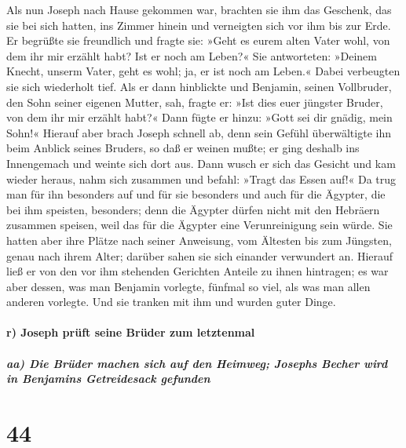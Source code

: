  Als nun Joseph nach Hause gekommen war, brachten sie ihm
das Geschenk, das sie bei sich hatten, ins Zimmer hinein und verneigten
sich vor ihm bis zur Erde.  Er begrüßte sie freundlich
und fragte sie: »Geht es eurem alten Vater wohl, von dem ihr mir erzählt
habt? Ist er noch am Leben?«  Sie antworteten: »Deinem
Knecht, unserm Vater, geht es wohl; ja, er ist noch am Leben.« Dabei
verbeugten sie sich wiederholt tief.  Als er dann
hinblickte und Benjamin, seinen Vollbruder, den Sohn seiner eigenen
Mutter, sah, fragte er: »Ist dies euer jüngster Bruder, von dem ihr mir
erzählt habt?« Dann fügte er hinzu: »Gott sei dir gnädig, mein Sohn!«
 Hierauf aber brach Joseph schnell ab, denn sein Gefühl
überwältigte ihn beim Anblick seines Bruders, so daß er weinen mußte; er
ging deshalb ins Innengemach und weinte sich dort aus. 
Dann wusch er sich das Gesicht und kam wieder heraus, nahm sich zusammen
und befahl: »Tragt das Essen auf!«  Da trug man für ihn
besonders auf und für sie besonders und auch für die Ägypter, die bei
ihm speisten, besonders; denn die Ägypter dürfen nicht mit den Hebräern
zusammen speisen, weil das für die Ägypter eine Verunreinigung sein
würde.  Sie hatten aber ihre Plätze nach seiner
Anweisung, vom Ältesten bis zum Jüngsten, genau nach ihrem Alter;
darüber sahen sie sich einander verwundert an.  Hierauf
ließ er von den vor ihm stehenden Gerichten Anteile zu ihnen hintragen;
es war aber dessen, was man Benjamin vorlegte, fünfmal so viel, als was
man allen anderen vorlegte. Und sie tranken mit ihm und wurden guter
Dinge.

\hypertarget{r-joseph-pruxfcft-seine-bruxfcder-zum-letztenmal}{%
\paragraph{r) Joseph prüft seine Brüder zum
letztenmal}\label{r-joseph-pruxfcft-seine-bruxfcder-zum-letztenmal}}

\hypertarget{aa-die-bruxfcder-machen-sich-auf-den-heimweg-josephs-becher-wird-in-benjamins-getreidesack-gefunden}{%
\subparagraph{aa) Die Brüder machen sich auf den Heimweg; Josephs Becher
wird in Benjamins Getreidesack
gefunden}\label{aa-die-bruxfcder-machen-sich-auf-den-heimweg-josephs-becher-wird-in-benjamins-getreidesack-gefunden}}

\hypertarget{section-43}{%
\section{44}\label{section-43}}

